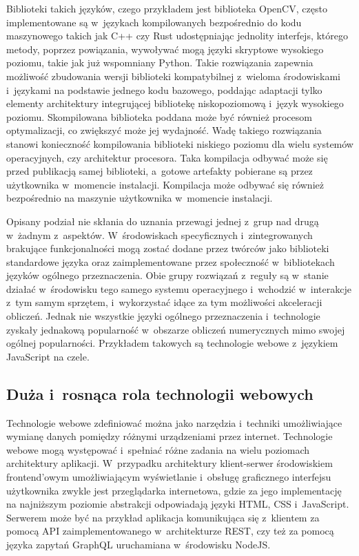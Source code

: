 Biblioteki takich języków, czego przykładem jest biblioteka OpenCV, często implementowane są w~językach kompilowanych bezpośrednio do kodu maszynowego takich jak C++ czy Rust udostępniając jednolity interfejs, którego metody, poprzez powiązania, wywoływać mogą języki skryptowe wysokiego poziomu, takie jak już wspomniany Python. Takie rozwiązania zapewnia możliwość zbudowania wersji biblioteki kompatybilnej z~wieloma środowiskami i~językami na podstawie jednego kodu bazowego, poddając adaptacji tylko elementy architektury integrującej bibliotekę niskopoziomową i~język wysokiego poziomu. Skompilowana biblioteka poddana może być również procesom optymalizacji, co zwiększyć może jej wydajność. Wadę takiego rozwiązania stanowi konieczność kompilowania biblioteki niskiego poziomu dla wielu systemów operacyjnych, czy architektur procesora. Taka kompilacja odbywać może się przed publikacją samej biblioteki, a~gotowe artefakty pobierane są przez użytkownika w~momencie instalacji. Kompilacja może odbywać się również bezpośrednio na maszynie użytkownika w~momencie instalacji.


Opisany podział nie skłania do uznania przewagi jednej z~grup nad drugą w~żadnym z~aspektów. W~środowiskach specyficznych i~zintegrowanych brakujące funkcjonalności mogą zostać dodane przez twórców jako biblioteki standardowe języka oraz zaimplementowane przez społeczność w~bibliotekach języków ogólnego przeznaczenia. Obie grupy rozwiązań z~reguły są w~stanie działać w~środowisku tego samego systemu operacyjnego i~wchodzić w~interakcje z~tym samym sprzętem, i~wykorzystać idące za tym możliwości akceleracji obliczeń. Jednak nie wszystkie języki ogólnego przeznaczenia i~technologie zyskały jednakową popularność w~obszarze obliczeń numerycznych mimo swojej ogólnej popularności. Przykładem takowych są technologie webowe z~językiem JavaScript na czele.

\subsection{Duża i~rosnąca rola technologii webowych}

Technologie webowe zdefiniować można jako narzędzia i~techniki umożliwiające wymianę danych pomiędzy różnymi urządzeniami przez internet. Technologie webowe mogą występować i~spełniać różne zadania na wielu poziomach architektury aplikacji. W~przypadku architektury klient-serwer środowiskiem frontend'owym umożliwiającym wyświetlanie i~obsługę graficznego interfejsu użytkownika zwykle jest przeglądarka internetowa, gdzie za jego implementację na najniższym poziomie abstrakcji odpowiadają języki HTML, CSS i~JavaScript. Serwerem może być na przykład aplikacja komunikująca się z~klientem za pomocą API zaimplementowanego w~architekturze REST, czy też za pomocą języka zapytań GraphQL uruchamiana w~środowisku NodeJS. 

